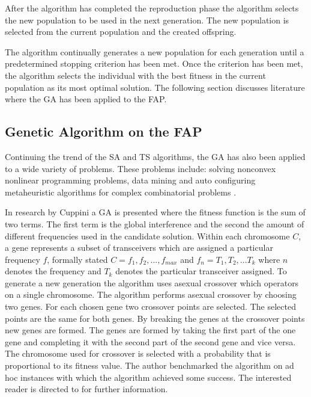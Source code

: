 After the algorithm has completed the reproduction phase the algorithm selects the new population to be used in the next generation. The new population is selected from the current population and the created offspring.

The algorithm continually generates a new population for each generation until a predetermined stopping criterion has been met. Once the criterion has been met, the algorithm selects the individual with the best fitness in the current population as its most optimal solution. The following section discusses literature where the \gls{GA} has been applied to the \gls{FAP}.

\subsection{Genetic Algorithm on the \gls{FAP}}
\label{sec:gaonfap}
Continuing the trend of the \gls{SA} and \gls{TS} algorithms, the \gls{GA} has also been applied to a wide variety of problems. These problems include: solving nonconvex nonlinear programming problems\cite{GANonConvex}, data mining \cite{SelfAdaptiveDataMiningGA} and auto configuring metaheuristic algorithms for complex combinatorial problems \cite{AutoComplexMeta}.

In research by Cuppini\cite{GACuppini} a \gls{GA} is presented where the fitness function is the sum of two terms. The first term is the global interference and the second the amount of different frequencies used in the candidate solution. Within each chromosome $C$, a gene represents a subset of transceivers which are assigned a particular frequency $f$, formally stated $C = {f_1,f_2, ..., f_{max}}$ and $f_n = {T_1, T_2, ... T_k}$ where $n$ denotes the frequency and $T_k$ denotes the particular transceiver assigned. To generate a new generation the algorithm uses asexual crossover which operators on a single chromosome. The algorithm performs asexual crossover by choosing two genes. For each chosen gene two crossover points are selected. The selected points are the same for both genes. By breaking the genes at the crossover points new genes are formed. The genes are formed by taking the first part of the one gene and completing it with the second part of the second gene and vice versa. The chromosome used for crossover is selected with a probability that is proportional to its fitness value. The author benchmarked the algorithm on ad hoc instances with which the algorithm achieved some success. The interested reader is directed to \cite{GACuppini} for further information.

